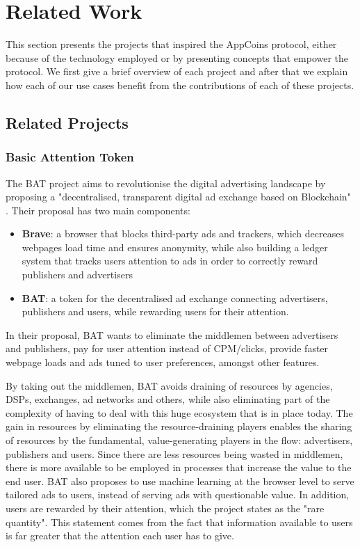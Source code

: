 \section{Related Work}

\label{sec:related}

This section presents the projects that inspired the AppCoins protocol, either because of the technology employed or by presenting concepts that empower the protocol. We first give a brief overview of each project and after that we explain how each of our use cases benefit from the contributions of each of these projects.

\subsection{Related Projects}

\subsubsection{Basic Attention Token}

The BAT project aims to revolutionise the digital advertising landscape by proposing a "decentralised, transparent digital ad exchange based on Blockchain" \cite{BAT}. Their proposal has two main components:

\begin{itemize}
	\item {\bf Brave}: a browser that blocks third-party ads and trackers, which decreases webpages load time and ensures anonymity, while also building a ledger system that tracks users attention to ads in order to correctly reward publishers and advertisers
	\item {\bf BAT}: a token for the decentralised ad exchange connecting advertisers, publishers and users, while rewarding users for their attention.
\end{itemize}

In their proposal, BAT wants to eliminate the middlemen between advertisers and publishers, pay for user attention instead of CPM/clicks, provide faster webpage loads and ads tuned to user preferences, amongst other features.

By taking out the middlemen, BAT avoids draining of resources by agencies, DSPs, exchanges, ad networks and others, while also eliminating part of the complexity of having to deal with this huge ecosystem that is in place today. The gain in resources by eliminating the resource-draining players enables the sharing of resources by the fundamental, value-generating  players in the flow: advertisers, publishers and users. Since there are less resources being wasted in middlemen, there is more available to be employed in processes that increase the value to the end user. BAT also proposes to use machine learning at the browser level to serve tailored ads to users, instead of serving ads with questionable value. In addition, users are rewarded by their attention, which the project states as the "rare quantity". This statement comes from the fact that information available to users is far greater that the attention each user has to give.

